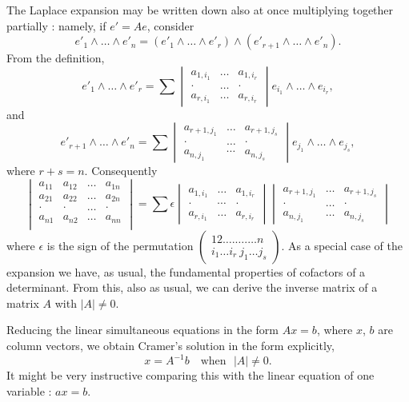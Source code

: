 The Laplace expansion may be written down also at once multiplying
together partially : namely, if $e' =Ae$, consider
$$
e'_1 \wedge \ldots \wedge e'_n = (e'_1 \wedge \ldots \wedge e'_r)
\wedge (e'_{r+1} \wedge \ldots \wedge e'_n).
$$
From the definition,
$$
e'_1 \wedge \ldots \wedge e'_r =\sum 
\begin{vmatrix}
a_{1,i_1} &\ldots &a_{1, i_r}\\
\cdot & \ldots & \cdot \\
a_{r,i_1} & \ldots & a_{r, i_r}
\end{vmatrix} e_{i_1} \wedge \ldots \wedge e_{i_r} ,
$$
and
$$
e'_{r+1} \wedge \ldots \wedge e'_n = \sum 
\begin{vmatrix}
a_{r+1, j_1} &\ldots & a_{r+1,j_s}\\
\cdot & \ldots & \cdot \\
a_{n,j_1} & \cdots & a_{n,j_s}
\end{vmatrix}
e_{j_1} \wedge \ldots \wedge e_{j_s},
$$
where $r + s = n$. Consequently
$$
\begin{vmatrix}
a_{11} &a_{12}& \ldots& a_{1n}\\
a_{21} &a_{22}& \ldots &a_{2n}\\
\cdot & \cdot & \ldots & \cdot \\
a_{n1} &a_{n2} &\ldots &a_{nn}\\
 \end{vmatrix} = \sum  \epsilon
\begin{vmatrix}
a_{1,i_1} &\ldots& a_{1, i_r}\\
\cdot & \cdots &\cdot \\
a_{r,i_1}& \ldots &a_{r, i_r}
\end{vmatrix}
\begin{vmatrix}
a_{r+1,j_1} & \ldots  &a_{r+1, j_s} \\
\cdot & \ldots & \cdot \\
a_{n,j_1} & \ldots & a_{n,j_s}
\end{vmatrix}
$$\pageoriginale
where $\epsilon$ is the sign of the permutation $\begin{pmatrix}
1 2 \ldots . \ldots . \ldots n\\
i_1 \ldots i_r ~ j_1 \ldots j_s
\end{pmatrix}$. As a special case of the expansion we have, as usual,
the fundamental properties of cofactors of a determinant. From this,
also as usual, we can derive the inverse matrix of a matrix $A$ with
$|A| \neq 0$.

Reducing the linear simultaneous equations in the form $Ax =b$, where
$x$, $b$ are column vectors, we obtain Cramer's solution in the form
explicitly, 
$$
x = A^{-1} b \text{ ~ when ~} |A| \neq 0.
$$
It might be very instructive comparing this with the linear equation
of one variable : $ax = b$.

